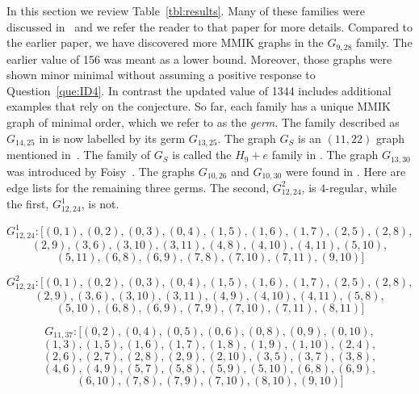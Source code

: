 \documentclass{amsart}
\theoremstyle{remark}
\begin{document}
{In this section we review Table~\ref{tbl:results}. Many of these families were discussed in~\cite{GMN} and we refer the reader to that paper for more details. Compared to the earlier paper, 
we have discovered more MMIK graphs in the $G_{9,28}$ family.
The earlier value of 156 was meant as a lower bound. Moreover, those graphs were shown minor minimal without assuming
a positive response to 
Question~\ref{que:ID4}. In contrast the updated value of 1344 includes additional examples that rely on the conjecture.
So far, 
each family has a unique MMIK graph of minimal order, which we refer to as the {\em germ}. The family described as $G_{14,25}$ in \cite{GMN} is now
labelled by its germ $G_{13,25}$. The graph $G_S$ is an $(11,22)$ graph mentioned in~\cite{FMMNN}. The family of $G_S$ is called the $H_9+e$ family in \cite{KM}.
The graph $G_{13,30}$ was introduced by Foisy~\cite{F2}.
The graphs $G_{10,26}$ and $G_{10,30}$ were found in \cite{MNPP}. Here are edge lists for the remaining three germs. The second, $G^2_{12,24}$, is $4$-regular,
while the first, $G^1_{12,24}$, is not.



$$G^1_{12,24}: {[} (0, 1) , (0, 2) , (0, 3) , (0, 4) , (1, 5) , (1, 6) , (1, 7) , (2, 5) , (2, 8) , $$
$$ (2, 9) , (3, 6) ,  (3, 10) , (3, 11) , (4, 8) , (4, 10) , (4, 11) , (5, 10) ,$$
$$ (5, 11) , (6, 8) , (6, 9) , (7, 8) , (7, 10) , (7, 11) , (9, 10) {]} $$

$$G^2_{12,24}: {[} (0, 1) , (0, 2) , (0, 3) , (0, 4) , (1, 5) , (1, 6) , (1, 7) , (2, 5) , (2, 8) , $$
$$(2, 9) , (3, 6) , (3, 10) , (3, 11) , (4, 9) , (4, 10) , (4, 11) , (5, 8) , $$
$$(5, 10) , (6, 8) , (6, 9) , (7, 9) , (7, 10) , (7, 11) , (8, 11) {]}$$

$$G_{11,37}: {[}(0, 2), (0, 4), (0, 5), (0, 6), (0, 8), (0, 9), (0, 10),$$
$$(1, 3), (1, 5), (1, 6), (1, 7), (1, 8), (1, 9), (1, 10), (2, 4),$$
$$(2, 6), (2, 7), (2, 8), (2, 9), (2, 10), (3, 5), (3, 7), (3, 8),$$
$$(4, 6), (4, 9), (5, 7), (5, 8), (5, 9), (5, 10), (6, 8), (6, 9),$$
$$(6, 10), (7, 8), (7, 9), (7, 10), (8, 10), (9, 10){]}$$

}
\end{document}
